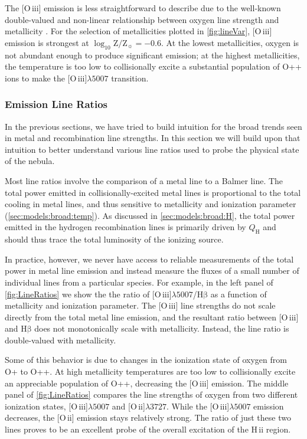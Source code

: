 \documentclass[linenumbers, trackchanges, tighten]{aastex61}%
\newcommand{\Fig}[1]{\autoref{fig:#1}}
\newcommand{\Sec}[1]{\autoref{sec:#1}}
\newcommand{\logten}{\ensuremath{\log_{10}}}
\newcommand{\oiii}{[O\,{\sc iii}]\xspace}
\newcommand{\oii}{[O\,{\sc ii}]\xspace}
\newcommand{\hb}{\ensuremath{\mathrm{H\beta}}}
\newcommand{\hii}{H\,{\sc ii}\xspace}
\newcommand\lam[1]{\ensuremath{\lambda #1}}
\newcommand{\logZeq}[1]{\ensuremath{\logten \mathrm{Z}/\mathrm{Z}_{\sun} = #1}}
\newcommand{\QH}{\ensuremath{Q_{\mathrm{H}}}}
\newcommand\oiiihb{\oiii{}\lam{5007}/\hb{}}
\begin{document}
The \oiii{} emission is less straightforward to describe due to the well-known double-valued and non-linear relationship between oxygen line strength and metallicity \citep{Pilyugin05, Kewley08}. For the selection of metallicities plotted in \Fig{lineVar}, \oiii{} emission is strongest at \logZeq{-0.6}. At the lowest metallicities, oxygen is not abundant enough to produce significant emission; at the highest metallicities, the temperature is too low to collisionally excite a substantial population of O++ ions to make the \oiii{}\lam{5007} transition. 

\subsubsection{Emission Line Ratios}\label{sec:models:lines:ratios}

In the previous sections, we have tried to build intuition for the broad trends seen in metal and recombination line strengths. In this section we will build upon that intuition to better understand various line ratios used to probe the physical state of the nebula.

Most line ratios involve the comparison of a metal line to a Balmer line. The total power emitted in collisionally-excited metal lines is proportional to the total cooling in metal lines, and thus sensitive to metallicity and ionization parameter (\Sec{models:broad:temp}). As discussed in \Sec{models:broad:H}, the total power emitted in the hydrogen recombination lines is primarily driven by \QH{} and should thus trace the total luminosity of the ionizing source. 

In practice, however, we never have access to reliable measurements of the total power in metal line emission and instead measure the fluxes of a small number of individual lines from a particular species. For example, in the left panel of \Fig{LineRatios} we show the the ratio of \oiiihb{} as a function of metallicity and ionization parameter. The \oiii{} line strengths do not scale directly from the total metal line emission, and the resultant ratio between \oiii{} and \hb{} does not monotonically scale with metallicity. Instead, the line ratio is double-valued with metallicity.

Some of this behavior is due to changes in the ionization state of oxygen from O+ to O++. At high metallicity temperatures are too low to collisionally excite an appreciable population of O++, decreasing the \oiii{} emission. The middle panel of \Fig{LineRatios} compares the line strengths of oxygen from two different ionization states, \oiii{}\lam{5007} and \oii{}\lam{3727}. While the \oiii{}\lam{5007} emission decreases, the \oii{} emission stays relatively strong. The ratio of just these two lines proves to be an excellent probe of the overall excitation of the \hii region.
\end{document}
